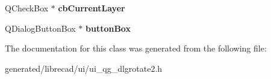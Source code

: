 \begin{DoxyCompactItemize}
\item 
\hypertarget{classUi__QG__DlgRotate2_a1ca469fcb9c26fffbfc965bd1b9e7b3d}{Q\-Check\-Box $\ast$ {\bfseries cb\-Current\-Layer}}\label{classUi__QG__DlgRotate2_a1ca469fcb9c26fffbfc965bd1b9e7b3d}

\item 
\hypertarget{classUi__QG__DlgRotate2_a04f84d68f01be5df0aef6575ef0d5199}{Q\-Dialog\-Button\-Box $\ast$ {\bfseries button\-Box}}\label{classUi__QG__DlgRotate2_a04f84d68f01be5df0aef6575ef0d5199}

\end{DoxyCompactItemize}


The documentation for this class was generated from the following file\-:\begin{DoxyCompactItemize}
\item 
generated/librecad/ui/ui\-\_\-qg\-\_\-dlgrotate2.\-h\end{DoxyCompactItemize}
